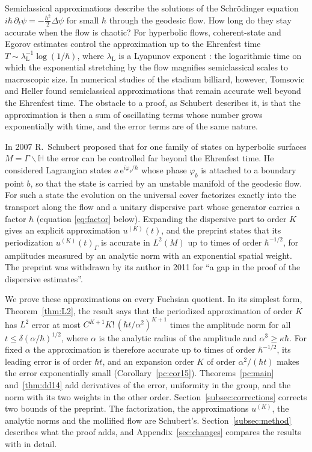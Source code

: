\documentclass[twoside,10pt]{article}
\numberwithin{equation}{section}
\theoremstyle{slbody}
\theoremstyle{remark}
\newcommand{\Hb}{\mathbb{H}}
\newcommand{\ue}{\mathrm{e}}
\begin{document}
Semiclassical approximations describe the solutions of the Schr\"odinger equation
$i\hbar\,\partial_t\psi=-\tfrac{\hbar^2}{2}\Delta\psi$ for small $\hbar$ through the geodesic flow. How long do they stay
accurate when the flow is chaotic? For hyperbolic flows, coherent-state and Egorov estimates control the approximation up to
the Ehrenfest time $T\sim\lambda_{\mathrm L}^{-1}\log(1/\hbar)$, where $\lambda_{\mathrm L}$ is a Lyapunov exponent
\cite{CR97,HJ00,BGP99,BR02}: the logarithmic time on which the exponential stretching by the flow magnifies semiclassical scales to
macroscopic size. In numerical studies of the
stadium billiard, however, Tomsovic and Heller \cite{TH91,TH93} found semiclassical approximations that remain accurate well
beyond the Ehrenfest time. The obstacle to a proof, as Schubert \cite{S} describes it, is that the approximation is then a
sum of oscillating terms whose number grows exponentially with time, and the error terms are of the same nature.

In 2007 R.~Schubert \cite{S} proposed that for one family of states on hyperbolic surfaces $M=\Gamma\backslash\Hb$ the error
can be controlled far beyond the Ehrenfest time. He considered Lagrangian states $a\,\ue^{i\varphi_b/\hbar}$
whose phase $\varphi_b$ is attached to a boundary point $b$, so that the state is carried by an unstable
manifold of the geodesic flow. For such a state the evolution on the universal cover factorizes exactly
into the transport along the flow and a unitary dispersive part whose generator carries a factor $\hbar$
(equation \eqref{eq:factor} below). Expanding the dispersive part to order $K$ gives an explicit approximation
$u^{(K)}(t)$, and the preprint \cite{S} states that its periodization $u^{(K)}(t)_\Gamma$ is accurate in $L^2(M)$
up to times of order $\hbar^{-1/2}$, for amplitudes measured by an analytic norm with an exponential spatial weight. The
preprint was withdrawn by its author in 2011 for ``a gap in the proof of the dispersive estimates''.

We prove these approximations on every Fuchsian quotient. In its simplest form, Theorem~\ref{thm:L2}, the result says that
the periodized approximation of order $K$ has $L^2$ error at most $C^{K+1}K!\,(\hbar t/\alpha^2)^{K+1}$ times the amplitude norm
for all $t\le\delta(\alpha/\hbar)^{1/2}$, where $\alpha$ is the analytic radius of the amplitude and $\alpha^3\ge\kappa\hbar$. For
fixed $\alpha$ the approximation is therefore accurate up to times of order $\hbar^{-1/2}$, its leading error is of order
$\hbar t$, and an expansion order $K$ of order $\alpha^2/(\hbar t)$ makes the error exponentially small
(Corollary~\ref{pc:cor15}). Theorems~\ref{pc:main} and~\ref{thm:dd14} add derivatives of the error, uniformity in the group,
and the norm with its two weights in the other order. Section~\ref{subsec:corrections} corrects two bounds of the preprint.
The factorization, the approximations $u^{(K)}$, the analytic norms and the mollified flow are Schubert's.
Section~\ref{subsec:method} describes what the proof adds, and Appendix~\ref{sec:changes} compares the results with \cite{S}
in detail.
\end{document}
